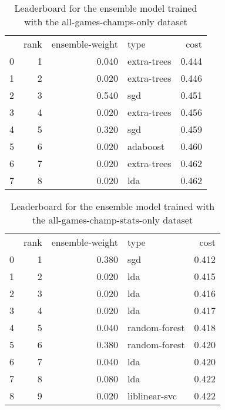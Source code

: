 \begin{table}[]
	\centering
	\begin{tabular}{lrrlr}
		  & rank & ensemble-weight & type        & cost  \\
		0 & 1    & 0.040           & extra-trees & 0.444 \\
		1 & 2    & 0.020           & extra-trees & 0.446 \\
		2 & 3    & 0.540           & sgd         & 0.451 \\
		3 & 4    & 0.020           & extra-trees & 0.456 \\
		4 & 5    & 0.320           & sgd         & 0.459 \\
		5 & 6    & 0.020           & adaboost    & 0.460 \\
		6 & 7    & 0.020           & extra-trees & 0.462 \\
		7 & 8    & 0.020           & lda         & 0.462 \\
	\end{tabular}

	\caption{Leaderboard for the ensemble model trained with the all-games-champs-only dataset}
	\label{tab:lb-all-games-champs-only-randsplit}
\end{table}

\begin{table}[]
	\centering
	\begin{tabular}{lrrlr}
		  & rank & ensemble-weight & type          & cost  \\
		0 & 1    & 0.380           & sgd           & 0.412 \\
		1 & 2    & 0.020           & lda           & 0.415 \\
		2 & 3    & 0.020           & lda           & 0.416 \\
		3 & 4    & 0.020           & lda           & 0.417 \\
		4 & 5    & 0.040           & random-forest & 0.418 \\
		5 & 6    & 0.380           & random-forest & 0.420 \\
		6 & 7    & 0.040           & lda           & 0.420 \\
		7 & 8    & 0.080           & lda           & 0.422 \\
		8 & 9    & 0.020           & liblinear-svc & 0.422 \\
	\end{tabular}

	\caption{Leaderboard for the ensemble model trained with the all-games-champ-stats-only dataset}
	\label{tab:lb-all-games-champ-stats-only}
\end{table}

